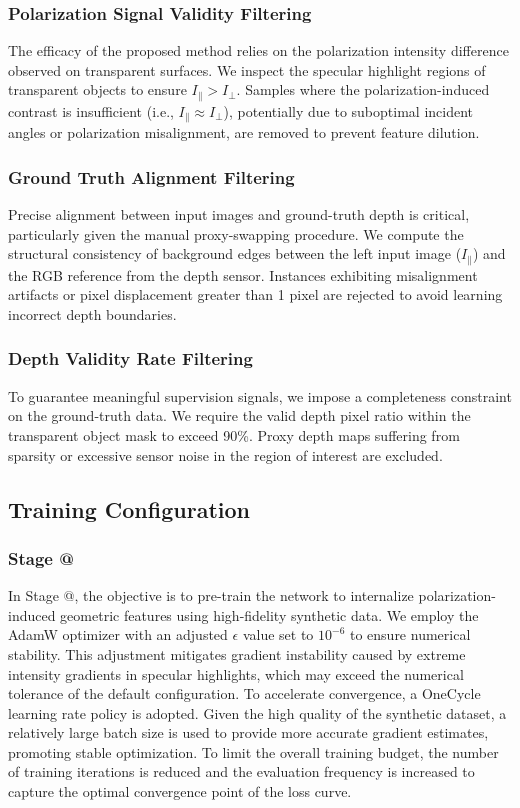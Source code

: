 \documentclass[letterpaper, 10 pt, conference]{ieeeconf}  %
\makeatletter
\newcommand{\Rmnum}[1]{\expandafter\@slowromancap\romannumeral #1@}
\makeatother
\begin{document}
\subsubsection{\textbf{Polarization Signal Validity Filtering}}
The efficacy of the proposed method relies on the polarization intensity difference observed on transparent surfaces. We inspect the specular highlight regions of transparent objects to ensure $I_{\parallel} > I_{\perp}$. Samples where the polarization-induced contrast is insufficient (i.e., $I_{\parallel} \approx I_{\perp}$), potentially due to suboptimal incident angles or polarization misalignment, are removed to prevent feature dilution.

\subsubsection{\textbf{Ground Truth Alignment Filtering}}
Precise alignment between input images and ground-truth depth is critical, particularly given the manual proxy-swapping procedure. We compute the structural consistency of background edges between the left input image ($I_{\parallel}$) and the RGB reference from the depth sensor. Instances exhibiting misalignment artifacts or pixel displacement greater than 1 pixel are rejected to avoid learning incorrect depth boundaries.

\subsubsection{\textbf{Depth Validity Rate Filtering}}
To guarantee meaningful supervision signals, we impose a completeness constraint on the ground-truth data. We require the valid depth pixel ratio within the transparent object mask to exceed 90\%. Proxy depth maps suffering from sparsity or excessive sensor noise in the region of interest are excluded.
\subsection{\textbf{Training Configuration}}
\subsubsection{\textbf{Stage \Rmnum{1}}}
In Stage \Rmnum{1}, the objective is to pre-train the network to internalize polarization-induced geometric features using high-fidelity synthetic data.
We employ the AdamW optimizer with an adjusted $\epsilon$ value set to $10^{-6}$ to ensure numerical stability.
This adjustment mitigates gradient instability caused by extreme intensity gradients in specular highlights, which may exceed the numerical tolerance of the default configuration.
To accelerate convergence, a OneCycle learning rate policy is adopted.
Given the high quality of the synthetic dataset, a relatively large batch size is used to provide more accurate gradient estimates, promoting stable optimization.
To limit the overall training budget, the number of training iterations is reduced and the evaluation frequency is increased to capture the optimal convergence point of the loss curve.
\end{document}
